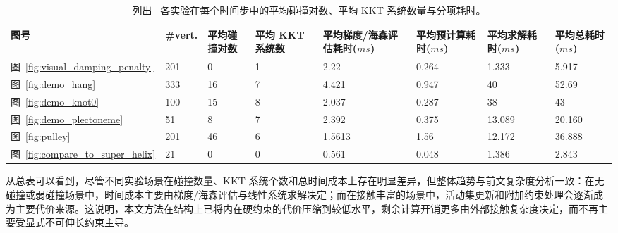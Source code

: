 \begin{table}[htbp]
\centering
\begin{tabularx}{\textwidth}{|l|X|X|X|X|X|X|X|}
\hline
图号 & \#vert. & 平均碰撞对数 & 平均 KKT 系统数 & 平均梯度/海森评估耗时($\si{ms}$) & 平均预计算耗时($\si{ms}$) & 平均求解耗时($\si{ms}$) & 平均总耗时($\si{ms}$) \\
\hline
图~\ref{fig:visual_damping_penalty} & 201 & 0 & 1 & 2.22 & 0.264 & 1.333 & 5.917 \\ \hline
图~\ref{fig:demo_hang} & 333 & 16 & 7 & 4.421 & 0.947 & 40 & 52.69 \\ \hline
图~\ref{fig:demo_knot0} & 100 & 15 & 8 & 2.037 & 0.287 & 38 & 43 \\ \hline
图~\ref{fig:demo_plectoneme} & 51 & 8 & 7 & 2.392 & 0.375 & 13.089 & 20.160 \\ \hline
图~\ref{fig:pulley} & 201 & 46 & 6 & 1.5613 & 1.56 & 12.172 & 36.888 \\ \hline
图~\ref{fig:compare_to_super_helix} & 21 & 0 & 0 & 0.561 & 0.048 & 1.386 & 2.843 \\ \hline
\end{tabularx}
\caption[本章实验的统计与性能]{列出~ 各实验在每个时间步中的平均碰撞对数、平均 KKT 系统数量与分项耗时。}
\label{table:timing}
\end{table}

从总表可以看到，尽管不同实验场景在碰撞数量、KKT 系统个数和总时间成本上存在明显差异，但整体趋势与前文复杂度分析一致：在无碰撞或弱碰撞场景中，时间成本主要由梯度/海森评估与线性系统求解决定；而在接触丰富的场景中，活动集更新和附加约束处理会逐渐成为主要代价来源。这说明，本文方法在结构上已将内在硬约束的代价压缩到较低水平，剩余计算开销更多由外部接触复杂度决定，而不再主要受显式不可伸长约束主导。
